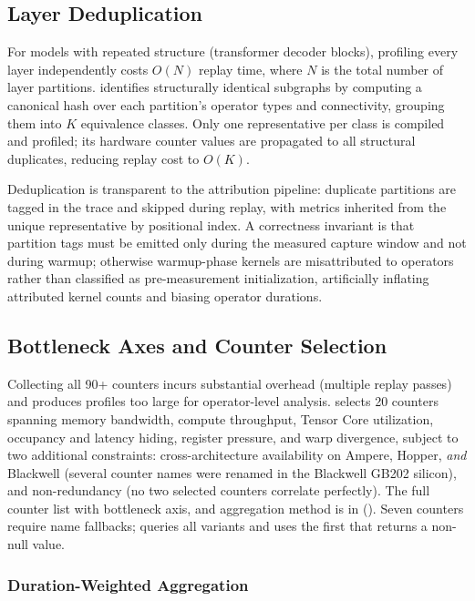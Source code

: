 \subsection{Layer Deduplication}
\label{sec:dedup}

For models with repeated structure (\eg transformer decoder blocks), profiling every
layer independently costs $O(N)$ \ncu replay time, where $N$ is the total number of layer partitions.
\sys identifies structurally identical subgraphs by computing a canonical hash over each
partition's operator types and connectivity, grouping them into $K$ equivalence classes.
Only one representative per class is compiled and profiled; its hardware counter values
are propagated to all structural duplicates, reducing replay cost to $O(K)$.

Deduplication is transparent to the attribution pipeline: duplicate partitions are
tagged in the \nsys trace and skipped during \ncu replay, with metrics inherited from
the unique representative by positional index.  A correctness invariant is that
partition tags must be emitted only during the measured capture window and not during
warmup; otherwise warmup-phase kernels are misattributed to operators rather than
classified as pre-measurement initialization, artificially inflating attributed kernel
counts and biasing operator durations.

\subsection{Bottleneck Axes and Counter Selection}
\label{sec:metrics}

Collecting all 90+ \ncu counters incurs substantial overhead (multiple replay passes) and
produces profiles too large for operator-level analysis.  \sys selects 20 counters spanning
memory bandwidth, compute throughput, Tensor Core utilization, occupancy and latency hiding,
register pressure, and warp divergence, subject to two additional constraints:
cross-architecture availability on Ampere, Hopper, \emph{and} Blackwell (several counter
names were renamed in the Blackwell GB202 silicon), and non-redundancy (no two selected
counters correlate perfectly).  The full counter list with bottleneck axis, and aggregation
method is in 
().  Seven counters require name fallbacks; \sys queries all
variants and uses the first that returns a non-null value.

\subsubsection{Duration-Weighted Aggregation}
\label{sec:aggregation}


